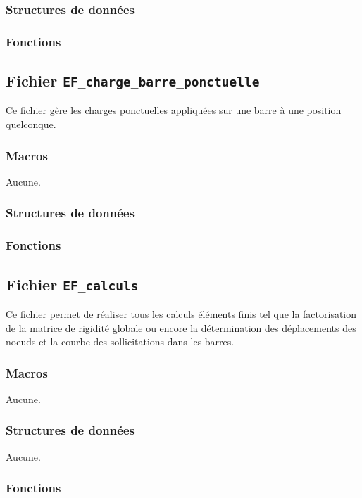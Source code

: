 \documentclass{article}
\begin{document}
\subsubsection{Structures de données}


\subsubsection{Fonctions}


\subsection{Fichier {\texttt{EF\_charge\_barre\_ponctuelle}}}
Ce fichier gère les charges ponctuelles appliquées sur une barre à une position quelconque.
\subsubsection{Macros}
Aucune.
\subsubsection{Structures de données}

\subsubsection{Fonctions}


\subsection{Fichier {\texttt{EF\_calculs}}}
Ce fichier permet de réaliser tous les calculs éléments finis tel que la factorisation de la matrice de rigidité globale ou encore la détermination des déplacements des noeuds et la courbe des sollicitations dans les barres.
\subsubsection{Macros}
Aucune.
\subsubsection{Structures de données}
Aucune.
\subsubsection{Fonctions}








\end{document}
